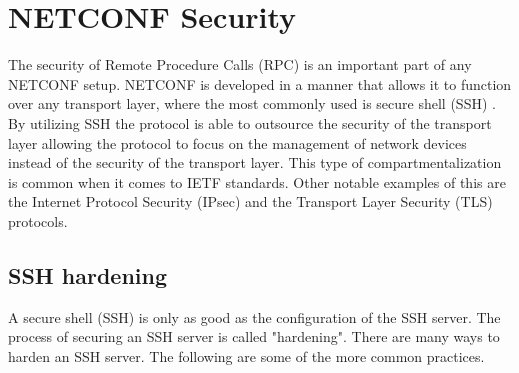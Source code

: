\documentclass[12pt]{article}
\begin{document}
\section{NETCONF Security}
The security of Remote Procedure Calls (RPC) is an important part of any
NETCONF setup. NETCONF is developed in a manner that allows it to function
over any transport layer, where the most commonly used is secure shell (SSH) \cite{lonvickSecureShellSSH2006}.
By utilizing SSH the protocol is able to outsource the security of the transport layer 
allowing the protocol to focus on the management of network devices instead
of the security of the transport layer. This type of compartmentalization is common 
when it comes to IETF standards. Other notable examples of this 
are the Internet Protocol Security (IPsec) \cite{seoSecurityArchitectureInternet2005} 
and the Transport Layer Security (TLS) \cite{rescorlaTransportLayerSecurity2008} protocols.

\subsection{SSH hardening}
A secure shell (SSH) is only as good as the configuration of the SSH server.
The process of securing an SSH server is called "hardening".
There are many ways to harden an SSH server. The following are some of the 
more common practices. 
\end{document}
